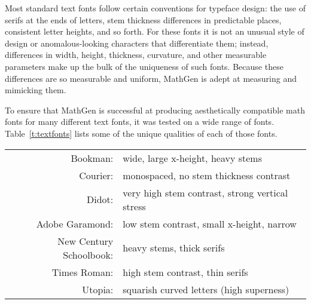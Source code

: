 
Most standard text fonts follow certain conventions for typeface design: the use
of serifs at the ends of letters, stem thickness differences in predictable
places, consistent letter heights, and so forth. For these fonts it is not an
unusual style of design or anomalous-looking characters that differentiate them;
instead, differences in width, height, thickness, curvature, and other
measurable parameters make up the bulk of the uniqueness of such fonts. Because
these differences are so measurable and uniform, MathGen is adept at measuring
and mimicking them.

To ensure that MathGen is successful at producing aesthetically compatible math
fonts for many different text fonts, it was tested on a wide range of fonts.
Table~\ref{t:textfonts} lists some of the unique qualities of each of those
fonts.

\begin{table*}
\begin{center}
\begin{tabular}{rl}
Bookman: & wide, large x-height, heavy stems \\
Courier: & monospaced, no stem thickness contrast \\
Didot: & very high stem contrast, strong vertical stress \\
Adobe Garamond: & low stem contrast, small x-height, narrow \\
New Century Schoolbook: & heavy stems, thick serifs \\
Times Roman: & high stem contrast, thin serifs \\
Utopia: & squarish curved letters (high superness)
\end{tabular}
\end{center}
\caption{Unusual qualities of each of the standard text fonts tested.}
\label{t:textfonts}
\end{table*}
